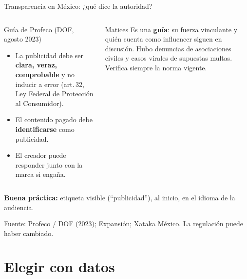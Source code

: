 \documentclass[aspectratio=169,xcolor=dvipsnames]{beamer}
\newcommand{\fuente}[1]{{\tiny\color{IPNgris}Fuente: #1}}
\begin{document}
\begin{frame}{Transparencia en México: ¿qué dice la autoridad?}
\begin{columns}[T]
  \begin{block}{Guía de Profeco (DOF, agosto 2023)}
    \small
    \begin{itemize}
      \item La publicidad debe ser \textbf{clara, veraz, comprobable} y no inducir a error (art.\,32, Ley Federal de Protección al Consumidor).
      \item El contenido pagado debe \textbf{identificarse} como publicidad.
      \item El creador puede responder junto con la marca si engaña.
    \end{itemize}
  \end{block}
  \begin{alertblock}{Matices}
    \small Es una \textbf{guía}: su fuerza vinculante y quién cuenta como influencer siguen en discusión. Hubo denuncias de asociaciones civiles y casos virales de supuestas multas. Verifica siempre la norma vigente.
  \end{alertblock}
\end{columns}
\vspace{4pt}
\begin{center}\small \textbf{Buena práctica:} etiqueta visible (\enquote{publicidad}), al inicio, en el idioma de la audiencia.\end{center}
\fuente{Profeco / DOF (2023); Expansión; Xataka México. La regulación puede haber cambiado.}
\end{frame}

\section[Con datos]{Elegir con datos}
\end{document}
